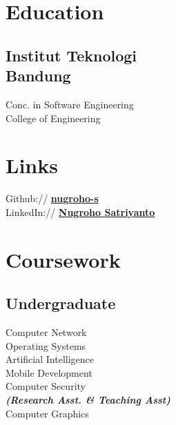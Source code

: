 \documentclass[a4paper]{deedy-resume} %
\begin{document}
\begin{minipage}[t]{0.33\textwidth} %


\section{Education} 

\subsection{Institut Teknologi \\Bandung}

Conc. in Software Engineering \\
College of Engineering \\

\sectionspace %


\section{Links} 

Github:// \href{https://github.com/nugroho-s}{\bf nugroho-s} \\
LinkedIn:// \href{https://www.linkedin.com/in/nugroho-satriyanto-721344112/}{\bf Nugroho Satriyanto} \\

\sectionspace %


\section{Coursework}

\subsection{Undergraduate}

Computer Network \\
Operating Systems \\
Artificial Intelligence \\
Mobile Development \\
Computer Security \\
{\footnotesize \textit{\textbf{(Research Asst. \& Teaching Asst) }}} \\
Computer Graphics


\end{minipage}
\end{document}
